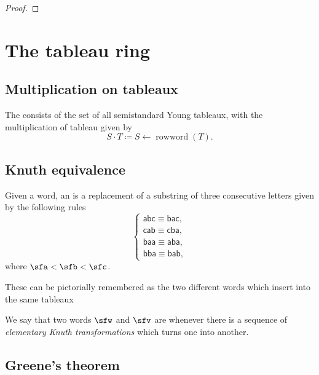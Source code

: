 \documentclass{article}
\DeclareMathOperator{\rowword}{rowword}
\begin{document}
\begin{proof}
\end{proof}

\section{The tableau ring}

\subsection{Multiplication on tableaux}

\begin{definition}
    The  consists of the set of all semistandard Young tableaux, with the multiplication of tableau given by
    \[
        S \cdot T
        \coloneq
        S \leftarrow \rowword (T).
    \]
\end{definition}


\subsection{Knuth equivalence}

\begin{definition}
    Given a word, an  is a replacement of a substring of three consecutive letters given by the following rules
    \[
        \begin{cases}
            \mathsf{abc} \equiv \mathsf{bac}, \\
            \mathsf{cab} \equiv \mathsf{cba}, \\
            \mathsf{baa} \equiv \mathsf{aba}, \\
            \mathsf{bba} \equiv \mathsf{bab},
        \end{cases}
    \]
    where $\sfa < \sfb < \sfc$.
\end{definition}

These can be pictorially remembered as the two different words which insert into the same tableaux

\begin{definition}
    We say that two words $\sfw$ and $\sfv$ are  whenever there is a sequence of \textit{elementary Knuth transformations} which turns one into another.
\end{definition}

\subsection{Greene's theorem}
\end{document}
